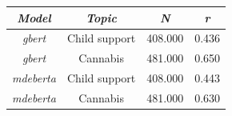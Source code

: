 \begin{tabular}{c c c c}
      \hline
      \textit{Model} & \textit{Topic} & \textit{N} & \textit{r} \\
      \hline
      \textit{gbert} & Child support & 408.000 & 0.436 \\
      \textit{gbert} & Cannabis & 481.000 & 0.650 \\
      \textit{mdeberta} & Child support & 408.000 & 0.443 \\
      \textit{mdeberta} & Cannabis & 481.000 & 0.630 \\
      \hline
    \end{tabular}